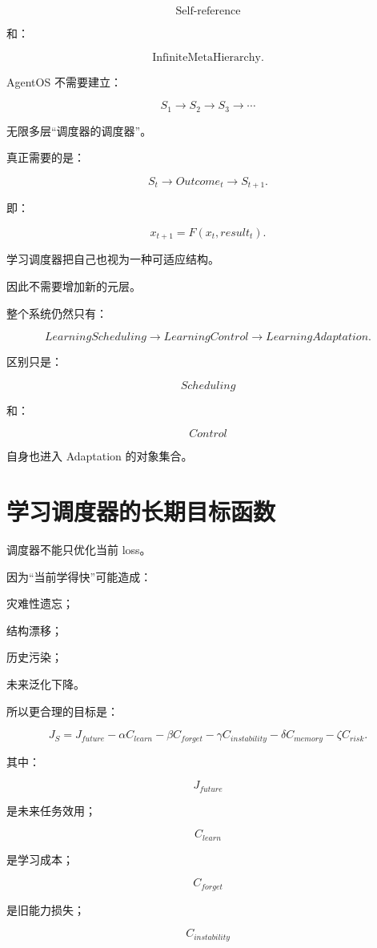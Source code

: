 \[
\boxed{
\text{Self-reference}
}
\]

和：

\[
\boxed{
\text{InfiniteMetaHierarchy}.
}
\]

AgentOS 不需要建立：

\[
S_1
\rightarrow
S_2
\rightarrow
S_3
\rightarrow\cdots
\]

无限多层“调度器的调度器”。

真正需要的是：

\[
\boxed{
S_t
\rightarrow
Outcome_t
\rightarrow
S_{t+1}.
}
\]

即：

\[
\boxed{
x_{t+1}
=
F(x_t,result_t).
}
\]

学习调度器把自己也视为一种可适应结构。

因此不需要增加新的元层。

整个系统仍然只有：

\[
\boxed{
LearningScheduling
\rightarrow
LearningControl
\rightarrow
LearningAdaptation.
}
\]

区别只是：

\[
\boxed{
Scheduling
}
\]

和：

\[
\boxed{
Control
}
\]

自身也进入 Adaptation 的对象集合。


\section{学习调度器的长期目标函数}

调度器不能只优化当前 loss。

因为“当前学得快”可能造成：

灾难性遗忘；

结构漂移；

历史污染；

未来泛化下降。

所以更合理的目标是：

\[
\boxed{
J_S
=
J_{future}
-
\alpha C_{learn}
-
\beta C_{forget}
-
\gamma C_{instability}
-
\delta C_{memory}
-
\zeta C_{risk}.
}
\]

其中：

\[
J_{future}
\]

是未来任务效用；

\[
C_{learn}
\]

是学习成本；

\[
C_{forget}
\]

是旧能力损失；

\[
C_{instability}
\]

